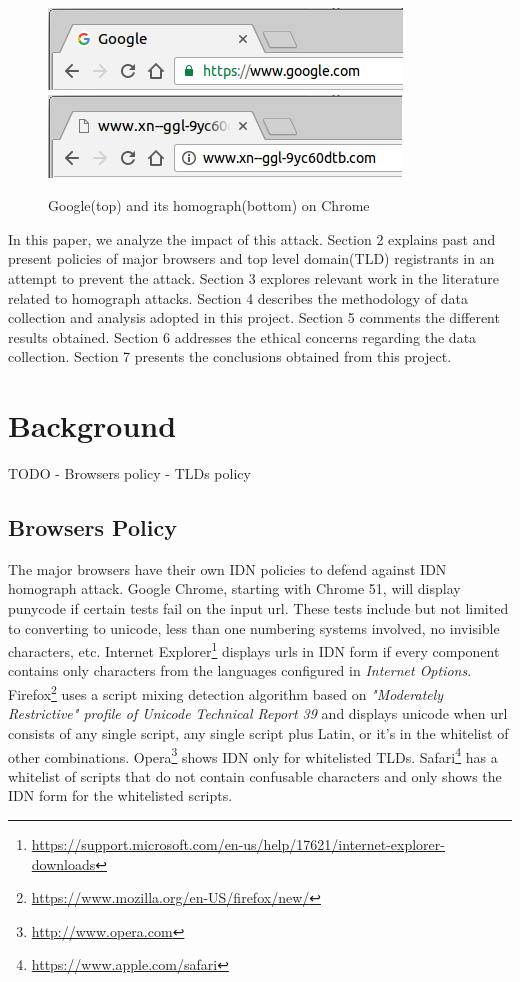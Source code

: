 \documentclass[letterpaper,twocolumn,10pt]{article}
\begin{document}
\begin{figure}[t]
  \includegraphics[width=\linewidth]{google.png}
  \includegraphics[width=\linewidth]{fakegoogle.png}
  \centering
  \caption{Google(top) and its homograph(bottom) on Chrome}
  \label{screenshot}
\end{figure}

In this paper, we analyze the impact of this attack.
Section 2 explains past and present policies of major browsers and top level domain(TLD) registrants in an attempt to prevent the attack.
Section 3 explores relevant work in the literature related to homograph attacks.
Section 4 describes the methodology of data collection and analysis adopted in this project.
Section 5 comments the different results obtained.
Section 6 addresses the ethical concerns regarding the data collection.
Section 7 presents the conclusions obtained from this project.

\section{Background}
TODO
- Browsers policy
- TLDs policy

\subsection{Browsers Policy}
The major browsers have their own IDN policies to defend against IDN homograph attack.
Google Chrome, starting with Chrome 51, will display punycode if certain tests fail on the input url.
These tests include but not limited to converting to unicode, less than one numbering systems involved, no invisible characters, etc.
Internet Explorer\footnote{\url{https://support.microsoft.com/en-us/help/17621/internet-explorer-downloads}} displays urls in IDN form if every component contains only characters from the languages configured in \textit{Internet Options}.
Firefox\footnote{\url{https://www.mozilla.org/en-US/firefox/new/}} uses a script mixing detection algorithm based on \textit{"Moderately Restrictive" profile of Unicode Technical Report 39} and displays unicode when url consists of any single script, any single script plus Latin, or it's in the whitelist of other combinations.
Opera\footnote{\url{http://www.opera.com}} shows IDN only for whitelisted TLDs.
Safari\footnote{\url{https://www.apple.com/safari}} has a whitelist of scripts that do not contain confusable characters and only shows the IDN form for the whitelisted scripts.
\end{document}
